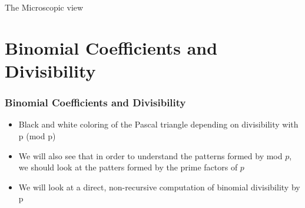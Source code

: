 \documentclass{beamer}
\begin{document}

\begin{frame}
    \centering
    \Large
    The Microscopic view 
\end{frame}

\section{Binomial Coefficients and Divisibility}

\begin{frame}
    \frametitle{Binomial Coefficients and Divisibility}
    \begin{itemize}
        \item Black and white coloring of the Pascal triangle depending on divisibility with p (mod p)
        \item We will also see that in order to understand the patterns formed by mod $p$, we should look at the patters formed by the prime factors of $p$ 
        \item We will look at a direct, non-recursive computation of binomial divisibility by p
    \end{itemize}
\end{frame}
\end{document}

